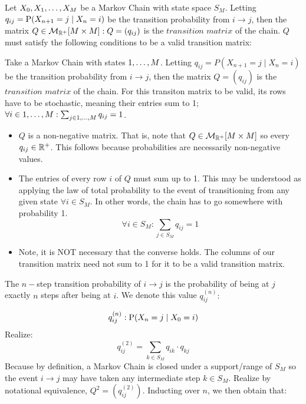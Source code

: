 \begin{definition}  Let $\seq[M]{X}$ be a Markov Chain with state space $S_M$. Letting $q_{ij} = \Prb(X_{n+1} = j \mid X_n = i)$ be the transition probability from $i \to j$, then the matrix $Q \in \mathcal{M}_{\R^+}[M\times M]: Q=(q_{ij})$ is the $\textit{transition matrix}$ of the chain. $Q$ must satisfy the following conditions to be a valid transition matrix:
\end{definition}

\begin{definition}
Take a Markov Chain with states $\oneto[M]$. Letting $q_{ij} = P(X_{n+1} = j \mid X_n = i)$ be the transition probability from $i \to j$, then the matrix $Q=(q_{ij})$ is the $\textit{transition matrix}$ of the chain. For this transiton matrix to be valid, its rows have to be stochastic, meaning their entries sum to 1; $\forall i \in \oneto[M]: \sum_{j \in \oneto[M]} q_{ij} = 1$.
\end{definition}

\begin{itemize}
\item $Q$ is a non-negative matrix. That is, note that $Q \in \mathcal{M}_{\R^+}[M\times M]$ so every $q_{ij} \in \R^+$. This follows because probabilities are necessarily non-negative values.
\item The entries of every row $i$ of $Q$ must sum up to 1. This may be understood as applying the law of total probability to the event of transitioning from any given state $\forall i \in S_M$. In other words, the chain has to go somewhere with probability 1.
$$\forall i \in S_M: \sum_{j \in S_M} q_{ij} = 1$$
\item Note, it is NOT necessary that the converse holds. The columns of our transition matrix need not sum to 1 for it to be a valid transition matrix.
\end{itemize}

\begin{definition} The $n-$step transition probability of $i \to j$ is the probability of being at $j$ exactly $n$ steps after being at $i$. We denote this value $q_{ij}^{(n)}:$
\end{definition}

$$ q_{ij}^{(n)}: \Prb(X_n = j \mid X_0 = i)$$
Realize:
$$q_{ij}^{(2)} = \sum_{k \in S_M} q_{ik}\cdot q_{kj}$$
Because by definition, a Markov Chain is closed under a support/range of $S_M$ so the event $i \to j$ may have taken any intermediate step $k \in S_M$. Realize by notational equivalence, $Q^2 = (q_{ij}^{(2)})$. Inducting over $n$, we then obtain that:

